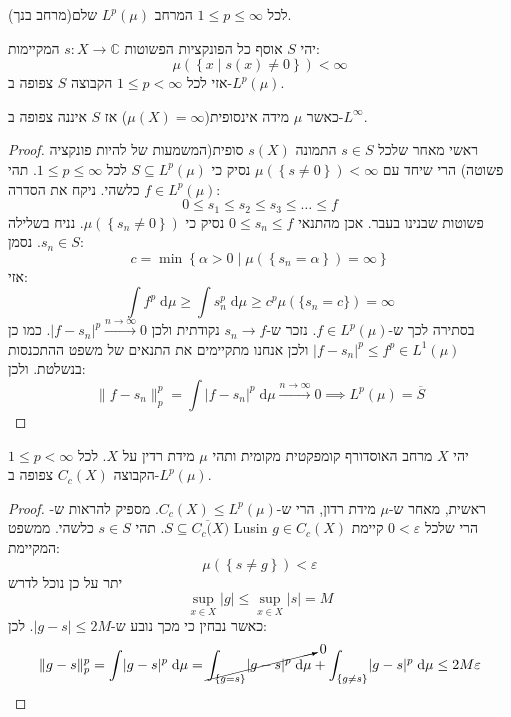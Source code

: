 \documentclass{tstextbook}
\begin{document}
\begin{proposition}
לכל \(1\leq p\leq \infty\) המרחב \(L^{p}\left( \mu \right)\) שלם(מרחב בנך).

\end{proposition}
\begin{proposition}
יהי \(S\) אוסף כל הפונקציות הפשוטות \(s:X\to \mathbb{C}\) המקיימות:
$$\mu\left( \left\{  x\mid s(x)\neq 0  \right\} \right)< \infty$$
אזי לכל \(1\leq p < \infty\) הקבוצה \(S\) צפופה ב-\(L^{p}\left( \mu \right)\).

\end{proposition}
\begin{remark}
כאשר \(\mu\) מידה אינסופית(\(\mu(X)=\infty\)) אז \(S\) איננה צפופה ב-\(L^{\infty}\).

\end{remark}
\begin{proof}
ראשי מאחר שלכל \(s \in S\) התמונה \(s(X)\) סופית(המשמעות של להיות פונקציה פשוטה) הרי שיחד עם \(\mu\left( \left\{  s\neq 0  \right\} \right)<\infty\) נסיק כי \(S\subseteq L^{p}\left( \mu \right)\) לכל \(1\leq p\leq \infty\). תהי \(f \in L^{p}\left( \mu \right)\) כלשהי. ניקח את הסדרה:
$$0\leq s_{1} \leq s_{2} \leq s_{3} \leq \dots \leq f$$
פשוטות שבנינו בעבר. אכן מהתנאי \(0\leq s_{n}\leq f\) נסיק כי \(\mu\left( \left\{  s_{n}\neq 0  \right\} \right)\).
נניח בשלילה \(s_{n}\in S\). נסמן:
$$c=\min \left\{  \alpha> 0\mid \mu\left( \left\{  s_{n}=\alpha  \right\} \right)=\infty  \right\}$$
אזי:
$$\int f^{p} \;\mathrm{d} \mu \geq \int  s_{n}^{p} \;\mathrm{d} \mu \geq c^{p}\mu\left( \{ s_{n}=c \} \right)=\infty $$
בסתירה לכך ש-\(f \in L^{p}\left( \mu \right)\). נזכר ש-\(s_{n}\to f\) נקודתית ולכן \(\lvert f-s_{n} \rvert^{p}\xrightarrow{n\to \infty}0\). כמו כן \(\lvert f-s_{n} \rvert^{p}\leq f^{p}\in L^{1}\left( \mu \right)\) ולכן אנחנו מתקיימים את התנאים של משפט ההתכנסות בנשלטת. ולכן:
$$\lVert f -s_{n}\rVert _{p}^{p}= \int \lvert f-s_{n} \rvert ^{p} \;\mathrm{d} \mu \xrightarrow{n\to \infty}0\implies L^{p}\left( \mu \right)=\overline{S}  $$

\end{proof}
\begin{proposition}
יהי \(X\) מרחב האוסדורף קומפקטית מקומית ותהי \(\mu\) מידת רדין על \(X\).
לכל \(1\leq p<\infty\) הקבוצה \(C_{c}(X)\) צפופה ב-\(L^{p}\left( \mu \right)\).

\end{proposition}
\begin{proof}
ראשית, מאחר ש-\(\mu\) מידת רדון, הרי ש-\(C_{c}(X)\leq L^{p}\left( \mu \right)\). מספיק להראות ש-\(S\subseteq \overline{C_{c}(X})\). תהי \(s \in S\) כלשהי. ממשפט Lusin הרי שלכל \(0< \varepsilon\) קיימת \(g \in C_{c}(X)\) המקיימת:
$$\mu\left( \left\{  s \neq g  \right\} \right)< \varepsilon$$
יתר על כן נוכל לדרש
$$\sup_{x \in X}\lvert g \rvert\leq \sup_{x \in X}\lvert s \rvert=M$$
כאשר נבחין כי מכך נובע ש-\(\lvert g-s \rvert\leq 2M\). לכן:
$$\lVert g-s \rVert _{p}^{p}=\int \lvert g-s \rvert ^{p} \;\mathrm{d} \mu=\cancelto{ 0 }{ \int_{\{ g=s \}} \lvert g-s \rvert ^{p} \;\mathrm{d} \mu }  + \int _{\left\{  g\neq s  \right\}}\lvert g-s \rvert ^{p} \;\mathrm{d} \mu \leq 2M\varepsilon$$

\end{proof}
\end{document}
